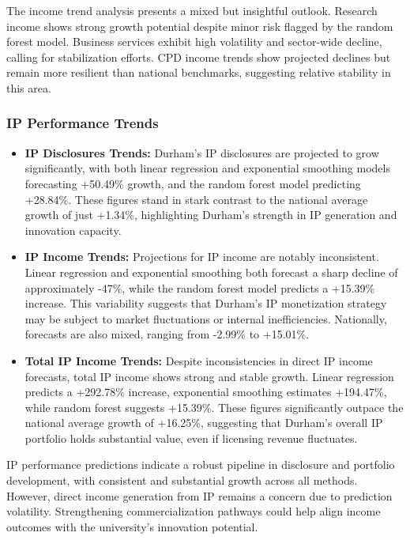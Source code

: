 \documentclass[journal,onecolumn, 10pt,draftclsnofoot]{IEEEtran}
\begin{document}
The income trend analysis presents a mixed but insightful outlook. Research income shows strong growth potential despite minor risk flagged by the random forest model. Business services exhibit high volatility and sector-wide decline, calling for stabilization efforts. CPD income trends show projected declines but remain more resilient than national benchmarks, suggesting relative stability in this area.

\subsubsection{IP Performance Trends}

\begin{itemize}
    \item \textbf{IP Disclosures Trends:} Durham's IP disclosures are projected to grow significantly, with both linear regression and exponential smoothing models forecasting +50.49\% growth, and the random forest model predicting +28.84\%. These figures stand in stark contrast to the national average growth of just +1.34\%, highlighting Durham's strength in IP generation and innovation capacity.
    
    \item \textbf{IP Income Trends:} Projections for IP income are notably inconsistent. Linear regression and exponential smoothing both forecast a sharp decline of approximately -47\%, while the random forest model predicts a +15.39\% increase. This variability suggests that Durham's IP monetization strategy may be subject to market fluctuations or internal inefficiencies. Nationally, forecasts are also mixed, ranging from -2.99\% to +15.01\%.
    
    \item \textbf{Total IP Income Trends:} Despite inconsistencies in direct IP income forecasts, total IP income shows strong and stable growth. Linear regression predicts a +292.78\% increase, exponential smoothing estimates +194.47\%, while random forest suggests +15.39\%. These figures significantly outpace the national average growth of +16.25\%, suggesting that Durham's overall IP portfolio holds substantial value, even if licensing revenue fluctuates.
\end{itemize}

IP performance predictions indicate a robust pipeline in disclosure and portfolio development, with consistent and substantial growth across all methods. However, direct income generation from IP remains a concern due to prediction volatility. Strengthening commercialization pathways could help align income outcomes with the university's innovation potential.
\end{document}
